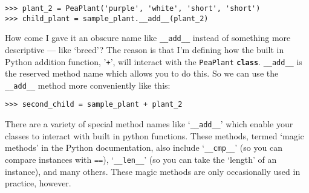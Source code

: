 \begin{lstlisting}[numbers=none]
>>> plant_2 = PeaPlant('purple', 'white', 'short', 'short')
>>> child_plant = sample_plant.__add__(plant_2)
\end{lstlisting}

How come I gave it an obscure name like \texttt{\_\_add\_\_} instead of something more descriptive --- like `breed'? The reason is that I'm defining how the built in Python addition function, '\texttt{+}', will interact with the \texttt{PeaPlant} \texttt{\textbf{class}}. \texttt{\_\_add\_\_} is the reserved method name which allows you to do this. So we can use the \texttt{\_\_add\_\_} method more conveniently like this:

\begin{lstlisting}[numbers=none]
>>> second_child = sample_plant + plant_2
\end{lstlisting}

There are a variety of special method names like `\texttt{\_\_add\_\_}' which enable your classes to interact with built in python functions. These methods, termed `magic methods' in the Python documentation, also include `\texttt{\_\_cmp\_\_}' (so you can compare instances with \texttt{==}), `\texttt{\_\_len\_\_}' (so you can take the `length' of an instance), and many others. These magic methods are only occasionally used in practice, however.